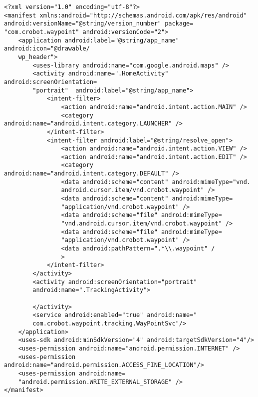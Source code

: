 \begin{lstlisting}
<?xml version="1.0" encoding="utf-8"?>
<manifest xmlns:android="http://schemas.android.com/apk/res/android" 
android:versionName="@string/version_number" package=
"com.crobot.waypoint" android:versionCode="2">
    <application android:label="@string/app_name" android:icon="@drawable/
    wp_header">
    	<uses-library android:name="com.google.android.maps" />
        <activity android:name=".HomeActivity" android:screenOrientation=
        "portrait"  android:label="@string/app_name">
            <intent-filter>
                <action android:name="android.intent.action.MAIN" />
                <category android:name="android.intent.category.LAUNCHER" />
            </intent-filter>
            <intent-filter android:label="@string/resolve_open">
            	<action android:name="android.intent.action.VIEW" />
            	<action android:name="android.intent.action.EDIT" />
            	<category android:name="android.intent.category.DEFAULT" />         
                <data android:scheme="content" android:mimeType="vnd.
                android.cursor.item/vnd.crobot.waypoint" />
                <data android:scheme="content" android:mimeType=
                "application/vnd.crobot.waypoint" />
                <data android:scheme="file" android:mimeType=
                "vnd.android.cursor.item/vnd.crobot.waypoint" />
                <data android:scheme="file" android:mimeType=
                "application/vnd.crobot.waypoint" />
				<data android:pathPattern=".*\\.waypoint" /
				>
            </intent-filter>
        </activity>
        <activity android:screenOrientation="portrait" 
        android:name=".TrackingActivity">
        	
        </activity>
        <service android:enabled="true" android:name="
        com.crobot.waypoint.tracking.WayPointSvc"/>
	</application>
    <uses-sdk android:minSdkVersion="4" android:targetSdkVersion="4"/>
    <uses-permission android:name="android.permission.INTERNET" />
	<uses-permission android:name="android.permission.ACCESS_FINE_LOCATION"/>
	<uses-permission android:name=
	"android.permission.WRITE_EXTERNAL_STORAGE" />
</manifest> 
\end{lstlisting}